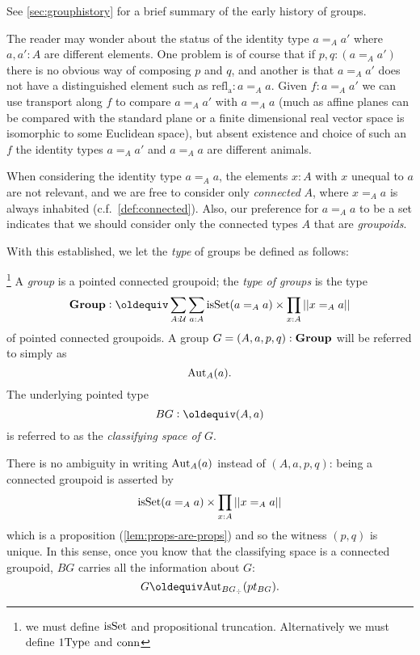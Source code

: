 \begin{definition}
See \cref{sec:grouphistory} for a brief summary of the early history of groups.
\begin{remark}
  The reader may wonder about the status of the identity type $a=_Aa'$ where $a,a':A$ are different elements.  One problem is of course that if $p,q:(a=_Aa')$ there is no obvious way of composing $p$ and $q$, and another is that $a=_Aa'$ does not have a distinguished element such as $\mathrm{refl{}_a}:a=_Aa$.
Given $f:a=_Aa'$ we can use transport along $f$ to compare $a=_Aa'$ with $a=_Aa$ (much as affine planes can be compared with the standard plane or a finite dimensional real vector space is isomorphic to some Euclidean space), but absent existence and choice of such an $f$ the identity types $a=_Aa'$ and $a=_Aa$ are different animals.
\end{remark}


\begin{remark}
  When considering the identity type $a=_Aa$, the elements $x:A$ with $x$ unequal to $a$ are not relevant, and we are free to consider only \emph{connected} $A$, \ie where $x=_Aa$ is always inhabited (c.f.~\cref{def:connected}).  Also, our preference for $a=_Aa$ to be a set indicates that we should consider only the connected types $A$ that are \emph{groupoids}.
\end{remark}


With this established, we let the \emph{type} of groups be defined as follows:

\begin{definition}\label{def:typegroup}\footnote{we must define  $\mathrm{isSet}$ and propositional truncation.  Alternatively we must define $\mathrm{1Type}$ and $\mathrm{conn}$}
  A \emph{group} is a pointed connected groupoid; the \emph{type of groups} is the type 
$$\typegroup\defequi\sum_{A:\mathcal U}\sum_{a:A}\isset(a=_Aa)\times\prod_{x:A}||x=_Aa||$$
of pointed connected groupoids.
A group $G=(A,a,p,q):\mathbf{Group}$ will be referred to simply as $$\mathrm{Aut}_A(a).$$  The underlying pointed type $$BG\defequi(A,a)$$ is referred to as the \emph{classifying space of $G$}. 
\end{definition}
\begin{remark}\label{rem:aut}
There is no ambiguity in writing $\mathrm{Aut}_A(a)$ instead of $(A,a,p,q)$: being a connected groupoid is asserted by 
$$\mathrm{isSet}(a=_Aa)\times\prod_{x:A}||x=_Aa||$$ which is a proposition  (\cref{lem:props-are-props}) and so the witness $(p,q)$  is unique.  In this sense, once you know that the classifying space is a connected groupoid, $BG$ carries all the information about $G$: $$G\oldequiv\aut_{BG_\div}(pt_{BG}).$$
\end{remark}
\end{definition}
